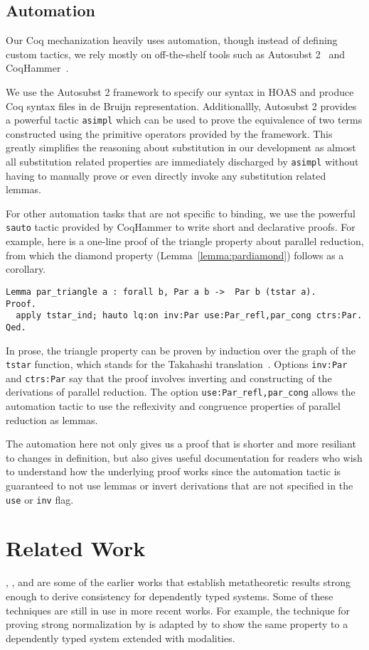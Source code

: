 \documentclass[acmsmall]{acmart}
\begin{document}
\subsection{Automation}
\label{sec:automation}
Our Coq mechanization heavily uses automation, though instead of
defining custom tactics, we rely mostly on off-the-shelf tools such as
Autosubst 2~\citep{autosubst2} and CoqHammer~\citep{czajka2018hammer}.

We use the Autosubst 2 framework to specify our syntax in HOAS and
produce Coq syntax files in de Bruijn representation. Additionallly,
Autosubst 2 provides a powerful tactic \texttt{asimpl} which
can be used to prove the equivalence of two terms constructed using
the primitive operators provided by the framework. This greatly
simplifies the reasoning about substitution in our development as
almost all substitution related properties are immediately discharged
by \texttt{asimpl} without having to manually prove or even directly invoke any
substitution related lemmas.

For other automation tasks that are not specific to binding, we use
the powerful \texttt{sauto} tactic provided by CoqHammer to write
short and declarative proofs. For example, here is a one-line proof of
the triangle property about parallel reduction, from which the diamond
property (Lemma~\ref{lemma:pardiamond}) follows as a corollary.
\begin{verbatim}
Lemma par_triangle a : forall b, Par a b ->  Par b (tstar a).
Proof.
  apply tstar_ind; hauto lq:on inv:Par use:Par_refl,par_cong ctrs:Par.
Qed.
\end{verbatim}
In prose, the triangle property can be proven by induction over the
graph of the \texttt{tstar} function, which stands for the Takahashi
translation~\citep{takahashi-parallel-reduction}. Options \texttt{inv:Par} and
\texttt{ctrs:Par} say that the proof involves inverting and
constructing of the derivations of parallel
reduction. The option \texttt{use:Par\_refl,par\_cong} allows the
automation tactic to use
the reflexivity and congruence properties of parallel
reduction as lemmas.

The automation here not only gives us a proof that is shorter and more
resiliant to changes in definition, but also gives useful
documentation for readers who wish to understand how the underlying
proof works since the automation tactic is guaranteed to not use
lemmas or invert derivations that are not specified in the
\texttt{use} or \texttt{inv} flag.


\section{Related Work}
\label{sec:relatedwork}
\citet{Martin-Lof-1973}, \citet{geuvers1994short}, and
\citet{barendregt:lambda-calculi-with-types} are some of the earlier
works that establish metatheoretic results strong enough to derive
consistency for dependently typed systems. Some of these techniques
are still in use in more recent works. For example, the technique for
proving strong normalization by \citet{geuvers1994short} is adapted by
\citet{moon2021graded} to show the same property to a dependently
typed system extended with modalities.
\end{document}
